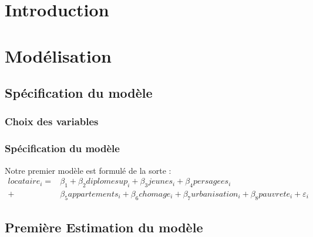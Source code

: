 \documentclass[]{article}
\begin{document}
\tableofcontents

\section{Introduction} 

\section{Modélisation}
\subsection{Spécification du modèle}
\subsubsection{Choix des variables}

\subsubsection{Spécification du modèle}
Notre premier modèle est formulé de la sorte : 
\begin{equation}
\begin{split}
    locataire_i = & \beta_1 + \beta_2diplomesup_i + \beta_3jeunes_i + \beta_4persagees_i\\
    + & \beta_5appartements_i + \beta_6chomage_i+ \beta_7urbanisation_i + \beta_8pauvrete_i + \varepsilon_i 
\end{split}
\end{equation}
\subsection{Première Estimation du modèle}
\end{document}
